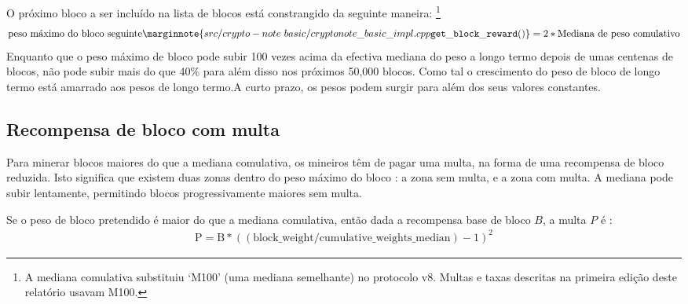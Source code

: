 O próximo bloco a ser incluído na lista de blocos está constrangido da seguinte maneira:
\footnote{A mediana comulativa substituiu `M100' (uma mediana semelhante) no protocolo v8. Multas e taxas descritas na primeira edição deste relatório \cite{ztm-1} usavam M100.} 
\vspace{.1cm}
\[\textrm{peso\ máximo\ do\ bloco\ seguinte}\marginnote{src/crypto- note\ basic/ cryptonote\_ basic\_ impl.cpp {\tt get\_block\_ reward()}} = 2*\textrm{Mediana de peso comulativo}\]%
Enquanto que o peso máximo de bloco pode subir 100 vezes acima da efectiva mediana do peso a longo termo depois de umas centenas de blocos, não pode subir mais do que 40\% para além disso nos próximos 50,000 blocos. Como tal o crescimento do peso de bloco de longo termo está amarrado aos pesos de longo termo.\newline A curto prazo, os pesos podem surgir para além dos seus valores constantes. 
\subsection{Recompensa de bloco com multa}
\label{subsec:penalty}

Para minerar blocos maiores do que a mediana comulativa, os mineiros têm de pagar uma multa, na forma de uma recompensa de bloco reduzida. Isto significa que existem duas zonas dentro do peso máximo do bloco : a zona sem multa, e a zona com multa. A mediana pode subir lentamente, permitindo blocos progressivamente maiores sem multa.

Se o peso de bloco pretendido é maior do que a mediana comulativa, então dada a recompensa base de bloco $B$, a multa $P$ é :
\begin{align*}
\textrm{P} = \textrm{B}*((\textrm{block\_weight}/\textrm{cumulative\_weights\_median}) - 1)^2
\end{align*}

